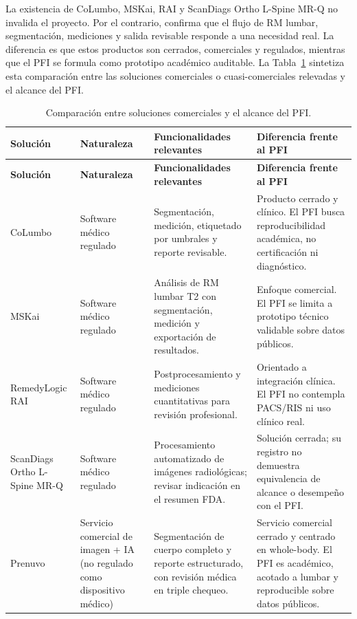 La existencia de CoLumbo, MSKai, RAI y ScanDiags Ortho L-Spine MR-Q no invalida el proyecto. Por el contrario, confirma que el flujo de RM lumbar, segmentación, mediciones y salida revisable responde a una necesidad real. La diferencia es que estos productos son cerrados, comerciales y regulados, mientras que el PFI se formula como prototipo académico auditable. La Tabla~\ref{tab:estado-arte-soluciones} sintetiza esta comparación entre las soluciones comerciales o cuasi-comerciales relevadas y el alcance del PFI.

\begingroup
\small
\sloppy
\setlength{\emergencystretch}{3em}
\setlength{\tabcolsep}{3pt}
\setlength{\LTleft}{0pt}
\setlength{\LTright}{0pt}
\renewcommand{\arraystretch}{1.15}
\begin{longtable}{|>{\raggedright\arraybackslash}p{}|>{\raggedright\arraybackslash}p{}|>{\raggedright\arraybackslash}p{}|>{\raggedright\arraybackslash}p{}|}
\caption{Comparación entre soluciones comerciales y el alcance del PFI.}
\label{tab:estado-arte-soluciones}\\
\hline
\textbf{Solución} & \textbf{Naturaleza} & \textbf{Funcionalidades relevantes} & \textbf{Diferencia frente al PFI} \\
\hline
\endfirsthead
\hline
\textbf{Solución} & \textbf{Naturaleza} & \textbf{Funcionalidades relevantes} & \textbf{Diferencia frente al PFI} \\
\hline
\endhead
CoLumbo & Software médico regulado & Segmentación, medición, etiquetado por umbrales y reporte revisable. & Producto cerrado y clínico. El PFI busca reproducibilidad académica, no certificación ni diagnóstico. \\
\hline
MSKai & Software médico regulado & Análisis de RM lumbar T2 con segmentación, medición y exportación de resultados. & Enfoque comercial. El PFI se limita a prototipo técnico validable sobre datos públicos. \\
\hline
RemedyLogic RAI & Software médico regulado & Postprocesamiento y mediciones cuantitativas para revisión profesional. & Orientado a integración clínica. El PFI no contempla PACS/RIS ni uso clínico real. \\
\hline
ScanDiags Ortho L-Spine MR-Q & Software médico regulado & Procesamiento automatizado de imágenes radiológicas; revisar indicación en el resumen FDA. & Solución cerrada; su registro no demuestra equivalencia de alcance o desempeño con el PFI. \\
\hline
Prenuvo & Servicio comercial de imagen + IA (no regulado como dispositivo médico) & Segmentación de cuerpo completo y reporte estructurado, con revisión médica en triple chequeo. & Servicio comercial cerrado y centrado en whole-body. El PFI es académico, acotado a lumbar y reproducible sobre datos públicos. \\

\end{longtable}
